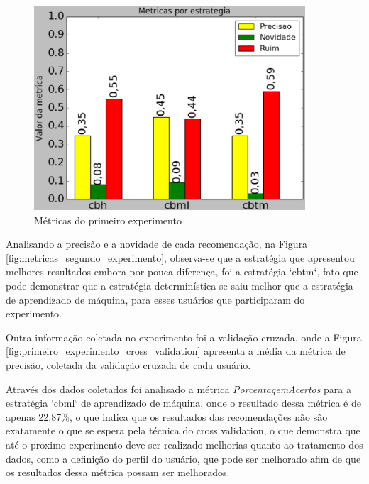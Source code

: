 \begin{figure}[h]
  \centering
  \includegraphics[width=0.9\textwidth]{figuras/metricas_primeiro_experimento.eps}
  \caption{Métricas do primeiro experimento}
  \label{fig:metricas_primeiro_experimento}
\end{figure}

Analisando a precisão e a novidade de cada recomendação, na Figura
\ref{fig:metricas_segundo_experimento}, observa-se que a estratégia que
apresentou melhores resultados embora por pouca diferença, foi a estratégia
`cbtm`, fato que pode demonstrar que a estratégia determinística se saiu melhor
que a estratégia de aprendizado de máquina, para esses usuários que
participaram do experimento.

Outra informação coletada no experimento foi a validação cruzada, onde a
Figura \ref{fig:primeiro_experimento_cross_validation} apresenta a média da
métrica de precisão, coletada da validação cruzada de cada usuário.

Através dos dados coletados foi analisado a métrica \textit{PorcentagemAcertos}
para a estratégia `cbml` de aprendizado de máquina, onde o resultado dessa
métrica é de apenas 22,87\%, o que indica que os resultados das recomendações
não são exatamente o que se espera pela técnica do cross validation, o que
demonstra que até o proximo experimento deve ser realizado melhorias quanto ao
tratamento dos dados, como a definição do perfil do usuário, que pode ser
melhorado afim de que os resultados dessa métrica possam ser melhorados.

\pagebreak

